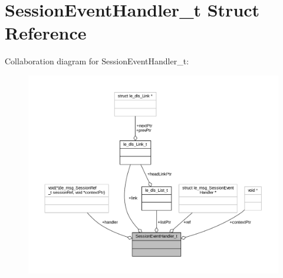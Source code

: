 \hypertarget{struct_session_event_handler__t}{}\section{Session\+Event\+Handler\+\_\+t Struct Reference}
\label{struct_session_event_handler__t}


Collaboration diagram for Session\+Event\+Handler\+\_\+t\+:
\nopagebreak
\begin{figure}[H]
\begin{center}
\leavevmode
\includegraphics[width=350pt]{struct_session_event_handler__t__coll__graph}
\end{center}
\end{figure}
